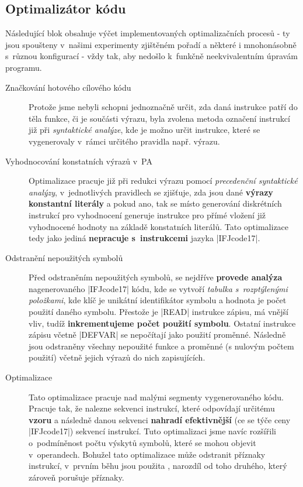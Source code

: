 \subsection{Optimalizátor kódu}
Následující blok obsahuje výčet implementovaných optimalizačních procesů - ty jsou spoušteny v~našimi experimenty zjištěném pořadí a některé i mnohonásobně s~různou konfigurací - vždy tak, aby nedošlo k~funkčně neekvivalentním úpravám programu. 

\begin{description}
    \item[Značkování hotového cílového kódu] Protože jsme nebyli schopni jednoznačně určit, zda daná instrukce patří do těla funkce, či je součásti výrazu, byla zvolena metoda označení instrukcí již při \emph{syntaktické analýze}, kde je možno určit instrukce, které se vygenerovaly v~rámci určitého pravidla např. výrazu.
    
    \item[Vyhodnocování konstatních výrazů v~PA]\label{subsec:optimization-cee} Optimalizace pracuje již při redukci výrazu pomocí \emph{precedenční syntaktické analýzy}, v~jednotlivých pravidlech se zjišťuje, zda jsou dané \textbf{výrazy konstantní literály} a pokud ano, tak se místo generování diskrétních instrukcí pro vyhodnocení generuje instrukce pro přímé vložení již vyhodnocené hodnoty na základě konstatních literálů. Tato optimalizace tedy jako jediná \textbf{nepracuje s~instrukcemi} jazyka \ic|IFJcode17|.
    
    \item[Odstranění nepoužitých symbolů] Před odstraněním nepoužitých symbolů, se nejdříve \textbf{provede analýza} nagenerovaného \ic|IFJcode17| kódu, kde se vytvoří \emph{tabulka s~rozptýlenými položkami}, kde klíč je unikátní identifikátor symbolu a hodnota je počet použití daného symbolu. Přestože je \ic|READ| instrukce zápisu, má vnější vliv, tudíž \textbf{inkrementujeme počet použití symbolu}. Ostatní instrukce zápisu včetně \ic|DEFVAR| se nepočítají jako použití proměnné. Následně jsou odstraněny všechny nepoužité funkce a proměnné (s nulovým počtem použití) včetně jejich výrazů do nich zapisujících.
    
    \item[Optimalizace ] Tato optimalizace pracuje nad malými segmenty vygenerovaného kódu. Pracuje tak, že nalezne sekvenci instrukcí, které odpovídají určitému \textbf{vzoru} a následně danou sekvenci \textbf{nahradí efektivnější} (ce se týče ceny \ic|IFJcode17|) sekvencí instrukcí. Tuto optimalizaci jsme navíc rozšířili o~podmíněnost počtu výskytů symbolů, které se mohou objevit v~operandech. Bohužel tato optimalizace může odstranit příznaky instrukcí, v~prvním běhu jsou použita , narozdíl od toho druhého, který zároveň porušuje příznaky.
    

\end{description}
